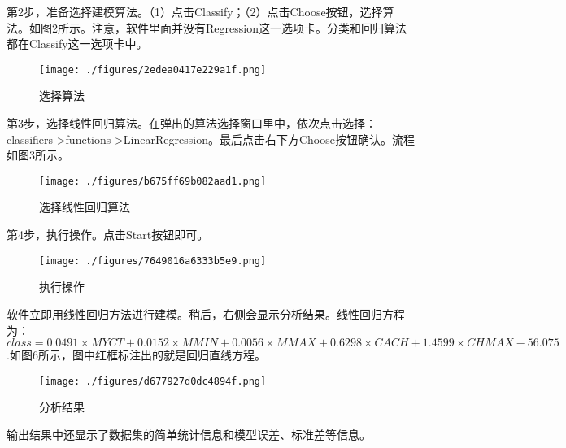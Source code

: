 第2步，准备选择建模算法。（1）点击Classify；（2）点击Choose按钮，选择算法。如图2所示。注意，软件里面并没有Regression这一选项卡。分类和回归算法都在Classify这一选项卡中。
\begin{figure}[ht]
\centering
\texttt{[image: ./figures/2edea0417e229a1f.png]}
\caption{选择算法} \label{fig_LiGr_2}
\end{figure}

第3步，选择线性回归算法。在弹出的算法选择窗口里中，依次点击选择：classifiers->functions->LinearRegression。最后点击右下方Choose按钮确认。流程如图3所示。
\begin{figure}[ht]
\centering
\texttt{[image: ./figures/b675ff69b082aad1.png]}
\caption{选择线性回归算法} \label{fig_LiGr_3}
\end{figure}

第4步，执行操作。点击Start按钮即可。
\begin{figure}[ht]
\centering
\texttt{[image: ./figures/7649016a6333b5e9.png]}
\caption{执行操作} \label{fig_LiGr_4}
\end{figure}

软件立即用线性回归方法进行建模。稍后，右侧会显示分析结果。线性回归方程为：$class=0.0491 \times MYCT+0.0152 \times MMIN+0.0056 \times MMAX+0.6298 \times CACH+1.4599 \times CHMAX-56.075$.如图6所示，图中红框标注出的就是回归直线方程。
\begin{figure}[ht]
\centering
\texttt{[image: ./figures/d677927d0dc4894f.png]}
\caption{分析结果} \label{fig_LiGr_6}
\end{figure}
输出结果中还显示了数据集的简单统计信息和模型误差、标准差等信息。